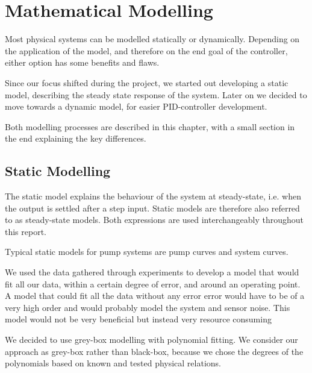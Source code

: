 \chapter{Mathematical Modelling}\label{ch:mathmodel}
Most physical systems can be modelled statically or dynamically.
Depending on the application of the model,
and therefore on the end goal of the controller,
either option has some benefits and flaws.

Since our focus shifted during the project, we started out developing a static model,
describing the steady state response of the system.
Later on we decided to move towards a dynamic model, for easier PID-controller development.

Both modelling processes are described in this chapter,
with a small section in the end explaining the key differences.
\section{Static Modelling}\label{sec:statmod}

The static model explains the behaviour of the system at steady-state,
i.e. when the output is settled after a step input.
Static models are therefore also referred to as steady-state models.
Both expressions are used interchangeably throughout this report.

Typical static models for pump systems are pump curves and system curves.

\newpage
We used the data gathered through experiments to develop a model that would fit all our data,
within a certain degree of error,
and around an operating point.
A model that could fit all the data without any error error would have to be of a very high order
and would probably model the system and sensor noise.
This model would not be very beneficial but instead very resource consuming

We decided to use grey-box modelling with polynomial fitting.
We consider our approach as grey-box rather than black-box,
because we chose the degrees of the polynomials based on known and tested physical relations.

